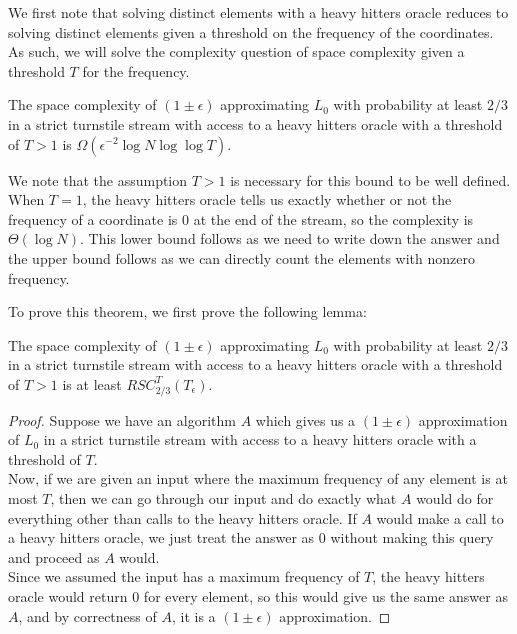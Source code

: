 We first note that solving distinct elements with a heavy hitters oracle reduces to solving distinct elements given a threshold on the frequency of the coordinates. As such, we will solve the complexity question of space complexity given a threshold $T$ for the frequency.

\begin{theorem}
\label{thm:streaming_bound}
The space complexity of $(1\pm \epsilon)$ approximating $L_0$ with probability at least $2/3$ in a strict turnstile stream with access to a heavy hitters oracle with a threshold of $T > 1$ is $\Omega(\epsilon^{-2} \log N \log \log T)$.
\end{theorem}

We note that the assumption $T > 1$ is necessary for this bound to be well defined. When $T=1$, the heavy hitters oracle tells us exactly whether or not the frequency of a coordinate is $0$ at the end of the stream, so the complexity is $\Theta(\log N)$. This lower bound follows as we need to write down the answer and the upper bound follows as we can directly count the elements with nonzero frequency.

To prove this theorem, we first prove the following lemma:

\begin{lemma}
\label{thm:promise_reduction}
The space complexity of $(1\pm \epsilon)$ approximating $L_0$ with probability at least $2/3$ in a strict turnstile stream with access to a heavy hitters oracle with a threshold of $T > 1$ is at least $RSC^T_{2/3}(T_\epsilon)$.
\end{lemma}
\begin{proof}
Suppose we have an algorithm $A$ which gives us a $(1\pm \epsilon)$ approximation of $L_0$ in a strict turnstile stream with access to a heavy hitters oracle with a threshold of $T$.\\

Now, if we are given an input where the maximum frequency of any element is at most $T$, then we can go through our input and do exactly what $A$ would do for everything other than calls to the heavy hitters oracle. If $A$ would make a call to a heavy hitters oracle, we just treat the answer as $0$ without making this query and proceed as $A$ would.\\

Since we assumed the input has a maximum frequency of $T$, the heavy hitters
oracle would return $0$ for every element, so this would give 
us the same answer as $A$, and by correctness of $A$, it is a $(1\pm \epsilon)$
approximation. %
\end{proof}

